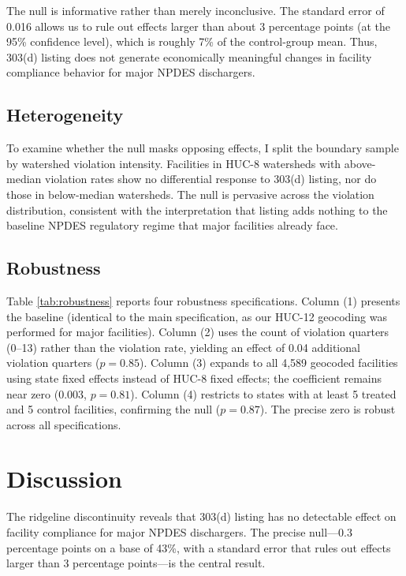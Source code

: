 \documentclass[12pt]{article}
\begin{document}
The null is informative rather than merely inconclusive. The standard error of 0.016 allows us to rule out effects larger than about 3 percentage points (at the 95\% confidence level), which is roughly 7\% of the control-group mean. Thus, 303(d) listing does not generate economically meaningful changes in facility compliance behavior for major NPDES dischargers.

\subsection{Heterogeneity}

To examine whether the null masks opposing effects, I split the boundary sample by watershed violation intensity. Facilities in HUC-8 watersheds with above-median violation rates show no differential response to 303(d) listing, nor do those in below-median watersheds. The null is pervasive across the violation distribution, consistent with the interpretation that listing adds nothing to the baseline NPDES regulatory regime that major facilities already face.

\subsection{Robustness}



Table \ref{tab:robustness} reports four robustness specifications. Column (1) presents the baseline (identical to the main specification, as our HUC-12 geocoding was performed for major facilities). Column (2) uses the count of violation quarters (0--13) rather than the violation rate, yielding an effect of 0.04 additional violation quarters ($p = 0.85$). Column (3) expands to all 4,589 geocoded facilities using state fixed effects instead of HUC-8 fixed effects; the coefficient remains near zero (0.003, $p = 0.81$). Column (4) restricts to states with at least 5 treated and 5 control facilities, confirming the null ($p = 0.87$). The precise zero is robust across all specifications.


\section{Discussion}

The ridgeline discontinuity reveals that 303(d) listing has no detectable effect on facility compliance for major NPDES dischargers. The precise null---0.3 percentage points on a base of 43\%, with a standard error that rules out effects larger than 3 percentage points---is the central result.
\end{document}
